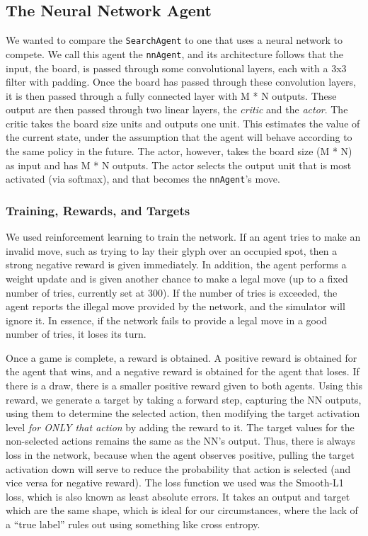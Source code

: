 \subsection{The Neural Network Agent}

We wanted to compare the \texttt{SearchAgent} to one that uses a neural network to compete.
We call this agent the \texttt{nnAgent}, and its architecture follows that the input, the board, is passed through 
some convolutional layers, each with a 3x3 filter with padding.
Once the board has passed through these convolution layers, it is then passed through a fully connected layer with M * N outputs.
These output are then passed through two linear layers, the \emph{critic} and the \emph{actor}.
The critic takes the board size units and outputs one unit.
This estimates the value of the current state, under the assumption that the agent will behave according to the same policy in the future.
The actor, however, takes the board size (M * N) as input and has M * N outputs.
The actor selects the output unit that is most activated (via softmax), and that becomes the \texttt{nnAgent}'s move.





\subsubsection{Training, Rewards, and Targets}

We used reinforcement learning to train the network.
If an agent tries to make an invalid move, such as trying to lay their glyph over an occupied spot, then a strong negative reward is given immediately.
In addition, the agent performs a weight update and is given another chance to make a legal move (up to a fixed number of tries, currently set at 300).
If the number of tries is exceeded, the agent reports the illegal move provided by the network, and the simulator will ignore it.
In essence, if the network fails to provide a legal move in a good number of tries, it loses its turn.

Once a game is complete, a reward is obtained.
A positive reward is obtained for the agent that wins, and a negative reward is obtained for the agent that loses.
If there is a draw, there is a smaller positive reward given to both agents.
Using this reward, we generate a target by taking a forward step, capturing the NN outputs, using them to determine the selected action, then modifying the target activation level \emph{for ONLY that action} by adding the reward to it.
The target values for the non-selected actions remains the same as the NN's output.
Thus, there is always loss in the network, because when the agent observes positive, pulling the target activation down will serve to reduce the probability that action is selected (and vice versa for negative reward).
The loss function we used was the Smooth-L1 loss, which is also known as least absolute errors.
It takes an output and target which are the same shape, which is ideal for our circumstances, where the lack of a ``true label'' rules out using something like cross entropy.

